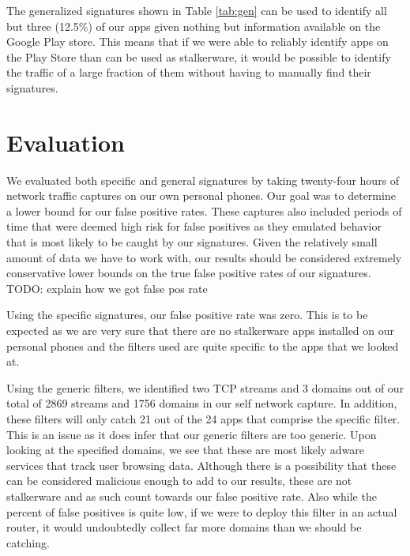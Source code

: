 \documentclass[acmtog]{acmart}
\begin{document}
The generalized signatures shown in Table \ref{tab:gen} can be used to identify 
all but three (12.5\%) of our apps given nothing but information available on 
the Google Play store. This means that if we were able to reliably identify 
apps on the 
Play Store than can be used as stalkerware, it would be possible to identify 
the traffic of a large fraction of them without having to manually find their 
signatures.


\section{Evaluation}

We evaluated both specific and general signatures by taking twenty-four hours 
of network traffic captures on our own personal phones. Our goal was to 
determine a lower bound for our false positive rates. These 
captures also included periods of time that were deemed high risk for false 
positives as they emulated behavior that is most likely to be caught by our 
signatures. Given the relatively small amount of data we have to work with, our 
results should be considered extremely conservative lower bounds on the true 
false positive rates of our signatures. TODO: explain how we got false pos rate

Using the specific signatures, our false positive rate was zero. This is to be 
expected as we are very sure that there 
are no stalkerware apps installed on our personal phones and the filters used 
are quite specific to the apps that we looked at. 

Using the generic filters, we identified two TCP streams and 3 domains out of 
our total of 2869 streams and 1756 domains in our self network capture. In 
addition, these filters will only catch 21 out of the 24 apps that comprise the 
specific filter. This is an issue as it does infer that our generic filters are 
too generic. Upon looking at the specified domains, we see that these are most 
likely adware services that track user browsing data. Although there is a 
possibility that these can be considered malicious enough to add to our 
results, these are not stalkerware and as such count towards our false positive 
rate. Also while the percent of false positives is quite low, if we were to 
deploy this filter in an actual router, it would undoubtedly collect far more 
domains than we should be catching.
\end{document}
